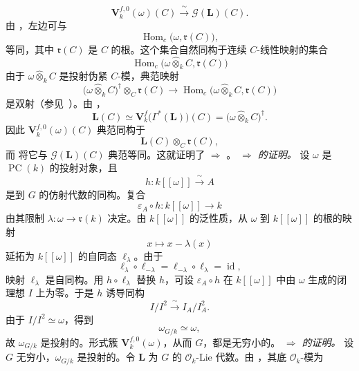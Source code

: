 \[
  \mathbf V_k^{f,0}(\omega)(C)
  \xrightarrow{\ \sim\ }
  \mathscr G(\mathbf L)(C).
\]
由 ，左边可与
\[
  \operatorname{Hom}_c\bigl(\omega,\mathfrak r(C)\bigr),
\]
等同，其中 \(\mathfrak r(C)\) 是 \(C\) 的根。这个集合自然同构于连续 \(C\)-线性映射的集合
\[
  \operatorname{Hom}_c\bigl(
    \omega\widehat\otimes_kC,\mathfrak r(C)
  \bigr)
\]
由于 \(\omega\widehat\otimes_kC\) 是投射伪紧 \(C\)-模，典范映射
\[
  \bigl(\omega\widehat\otimes_kC\bigr)^\dagger
  \otimes_C\mathfrak r(C)
  \longrightarrow
  \operatorname{Hom}_c\bigl(
    \omega\widehat\otimes_kC,\mathfrak r(C)
  \bigr)
\]
是双射\textup{（参见\ ）}。由 ，
\[
  \mathbf L(C)
  \simeq
  \mathbf V_k^f\bigl(\Gamma^*(\mathbf L)\bigr)(C)
  =
  \bigl(\omega\widehat\otimes_kC\bigr)^\dagger.
\]
因此 \(\mathbf V_k^{f,0}(\omega)(C)\) 典范同构于
\[
  \mathbf L(C)\otimes_C\mathfrak r(C),
\]
而 将它与 \(\mathscr G(\mathbf L)(C)\) 典范等同。这就证明了\textup{} \(\Rightarrow\) \textup{}。
\medskip
\noindent\textit{\textup{}
\(\boldsymbol{\Rightarrow}\) \textup{} 的证明。}
设 \(\omega\) 是 \(\operatorname{PC}(k)\) 的投射对象，且
\[
  h:k[[\omega]]\xrightarrow{\ \sim\ }A
\]
是到 \(G\) 的仿射代数的同构。复合
\[
  \varepsilon_A\circ h:k[[\omega]]\longrightarrow k
\]
由其限制 \(\lambda:\omega\to\mathfrak r(k)\) 决定。由 \(k[[\omega]]\) 的泛性质，从 \(\omega\) 到 \(k[[\omega]]\) 的根的映射
\[
  x\longmapsto x-\lambda(x)
\]
延拓为 \(k[[\omega]]\) 的自同态 \(\ell_\lambda\)。由于
\[
  \ell_\lambda\circ\ell_{-\lambda}
  =
  \ell_{-\lambda}\circ\ell_\lambda
  =
  \operatorname{id},
\]
映射 \(\ell_\lambda\) 是自同构。用 \(h\circ\ell_\lambda\) 替换 \(h\)，可设 \(\varepsilon_A\circ h\) 在 \(k[[\omega]]\) 中由 \(\omega\) 生成的闭理想 \(I\) 上为零。于是 \(h\) 诱导同构
\[
  I/I^2\xrightarrow{\ \sim\ }I_A/I_A^2.
\]
由于 \(I/I^2\simeq\omega\)，得到
\[
  \omega_{G/k}\simeq\omega,
\]
故 \(\omega_{G/k}\) 是投射的。形式簇 \(\mathbf V_k^{f,0}(\omega)\)，从而 \(G\)，都是无穷小的。
\medskip
\noindent\textit{\textup{}
\(\boldsymbol{\Rightarrow}\) \textup{} 的证明。}
设 \(G\) 无穷小，\(\omega_{G/k}\) 是投射的。令 \(\mathbf L\) 为 \(G\) 的 \(\mathcal O_k\)-Lie 代数。由 ，其底 \(\mathcal O_k\)-模为

